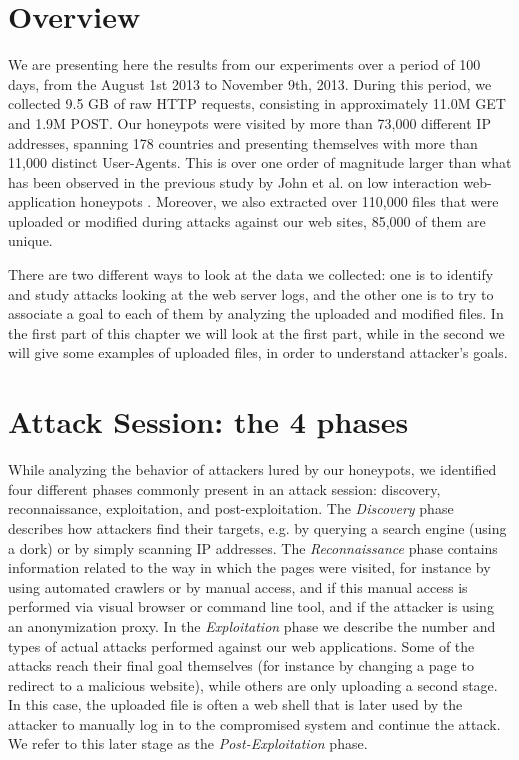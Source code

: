 \section{Overview}

We are presenting here the results from our experiments over a period of 100 days, from the August 1st 2013 to November 9th, 2013. During this period, we collected 9.5 GB of raw HTTP requests, consisting in approximately 11.0M GET and 1.9M POST. Our honeypots were visited by more than 73,000 different IP addresses, spanning 178 countries and presenting themselves with more than 11,000 distinct User-Agents. This is over one order of magnitude larger than what has been observed in the previous study by John et al. on low interaction web-application honeypots \cite{johnhsh}. Moreover, we also extracted over 110,000 files that were uploaded or modified during attacks against our web sites, 85,000 of them are unique.

There are two different ways to look at the data we collected: one is to identify and study attacks looking at the web server logs, and the other one is to try to associate a goal to each of them by analyzing the uploaded and modified files. In the first part of this chapter we will look at the first part, while in the second we will give some examples of uploaded files, in order to understand attacker's goals.

\section{Attack Session: the 4 phases}

While analyzing the behavior of attackers lured by our honeypots, we identified four different phases commonly present in an attack session: discovery, reconnaissance, exploitation, and post-exploitation. The \emph{Discovery} phase describes how attackers find their targets, e.g. by querying a search engine (using a dork) or by simply scanning IP addresses. The \emph{Reconnaissance} phase contains information related to the way in which the pages were visited, for instance by using automated crawlers or by manual access, and if this manual access is performed via visual browser or command line tool, and if the attacker is using an anonymization proxy. In the \emph{Exploitation} phase we describe the number and types of actual attacks performed against our web applications. Some of the attacks reach their final goal themselves (for instance by changing a page to redirect to a malicious website), while others are only uploading a second stage. In this case, the uploaded file is often a web shell that is later used by the attacker to manually log in to the compromised system and continue the attack. We refer to this later stage as the \emph{Post-Exploitation} phase.

